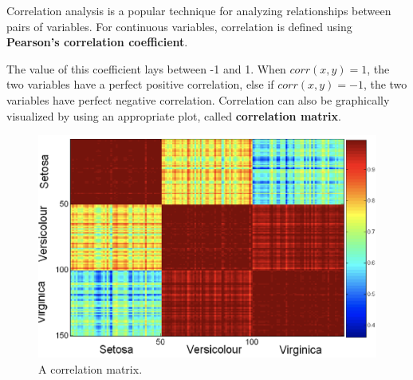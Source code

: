 Correlation analysis is a popular technique for analyzing relationships between pairs of variables. For continuous variables, correlation is defined using \textbf{Pearson's correlation coefficient}.


The value of this coefficient lays between -1 and 1. When $\textit{corr}(x,y) = 1$, the two variables have a perfect positive correlation, else if $\textit{corr}(x,y) = -1$, the two variables have perfect negative correlation. Correlation can also be graphically visualized by using an appropriate plot, called \textbf{correlation matrix}.

\begin{figure}[ht]
    \centering
    \includegraphics[width=0.4\linewidth]{img/correlation matrix.png}
    \caption{A correlation matrix.}
\end{figure}